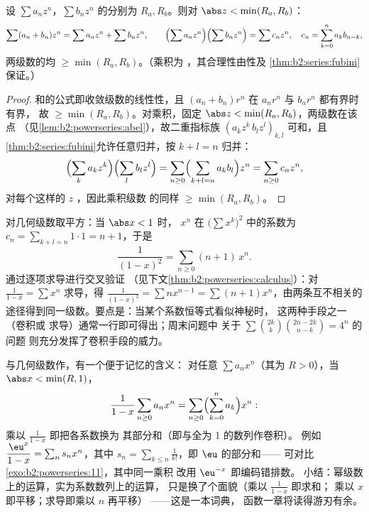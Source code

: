 \begin{proposition}[运算]\label{prop:b2:powerseries:operations}
设 $\sum a_nz^n$，$\sum b_nz^n$ 的分别为 $R_a, R_b$。则对
$\abs z < \min(R_a, R_b)$：
\[
\sum (a_n + b_n)z^n = \sum a_nz^n + \sum b_nz^n,
\qquad
\Bigl(\sum a_nz^n\Bigr)\Bigl(\sum b_nz^n\Bigr) = \sum c_n z^n,
\quad c_n = \sum_{k=0}^{n} a_kb_{n-k},
\]
两级数的均 $\geq \min(R_a, R_b)$。（乘积为
，其合理性由性及
\cref{thm:b2:series:fubini}保证。）
\end{proposition}

\begin{proof}
和的公式即收敛级数的线性性，且
$(a_n + b_n)r^n$ 在 $a_nr^n$ 与 $b_nr^n$ 都有界时有界，
故 $\geq \min(R_a, R_b)$。对乘积，固定 $\abs z
< \min(R_a, R_b)$，两级数在该点\emph{}
（见\cref{lem:b2:powerseries:abel}），故二重指标族
$(a_kz^k\,b_lz^l)_{k,l}$ 可和，且
\cref{thm:b2:series:fubini}允许任意归并，按 $k
+ l = n$ 归并：
\[
\Bigl(\sum_k a_kz^k\Bigr)\Bigl(\sum_l b_lz^l\Bigr)
= \sum_{n\geq0}\Bigl(\sum_{k+l=n}a_kb_l\Bigr)z^n
= \sum_{n\geq0}c_nz^n ,
\]
对每个这样的 $z$ ，因此乘积级数
的同样 $\geq \min(R_a, R_b)$。
\end{proof}

\begin{example}[柯西平方的交叉验证]\label{ex:b2:powerseries:cauchysquare}
对几何级数取平方：当 $\abs x < 1$ 时，
$x^n$ 在 $\bigl(\sum x^k\bigr)^2$ 中的系数为 $c_n = \sum_{k+l=n}
1\cdot1 = n + 1$，于是
\[
\frac{1}{(1-x)^2} = \sum_{n\geq0}(n+1)\,x^n .
\]
通过逐项求导进行交叉验证
（见下文\cref{thm:b2:powerseries:calculus}）：对
$\frac{1}{1-x} = \sum x^n$ 求导，得 $\frac{1}{(1-x)^2} = \sum
nx^{n-1} = \sum(n+1)x^n$，由两条互不相关的
途径得到同一级数。要点是：当某个系数恒等式看似神秘时，
这两种手段之一（卷积或
求导）通常一行即可得出；周末问题中
关于 $\sum\binom{2k}k\binom{2n-2k}{n-k} = 4^n$ 的问题
则充分发挥了卷积手段的威力。
\end{example}

\begin{example}\label{ex:b2:powerseries:partialsums}
与几何级数作，有一个便于记忆的含义：
对任意 $\sum a_nx^n$（其为 $R > 0$），当 $\abs x <
\min(R, 1)$，
\[
\frac{1}{1-x}\sum_{n\geq0}a_nx^n
= \sum_{n\geq0}\Bigl(\sum_{k=0}^{n}a_k\Bigr)x^n :
\]
乘以 $\frac{1}{1-x}$ 即把各系数换为
其部分和（即与全为 1 的数列作卷积）。
例如 $\dfrac{\eu^x}{1-x} = \sum_n s_n x^n$，其中 $s_n =
\sum_{k\leq n}\frac{1}{k!}$，即 $\eu$ 的部分和——
可对比 \cref{exo:b2:powerseries:11}，其中同一乘积
改用 $\eu^{-x}$ 即编码错排数。
小结：幂级数上的运算，实为系数数列上的运算，
只是换了个面貌（乘以 $\frac1{1-x}$ 即求和；
乘以 $x$ 即平移；求导即乘以 $n$ 再平移）
——这是一本词典，
函数一章将读得游刃有余。
\end{example}

